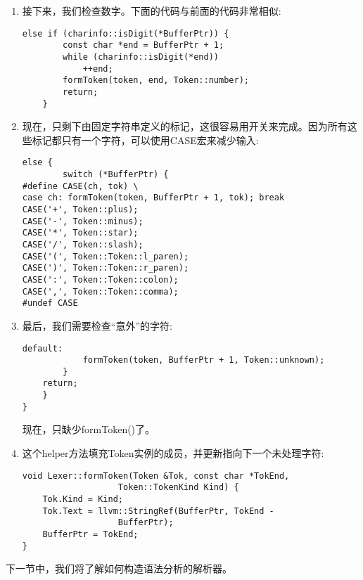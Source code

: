\begin{enumerate}
\item 接下来，我们检查数字。下面的代码与前面的代码非常相似:
\begin{lstlisting}[caption={}]
	else if (charinfo::isDigit(*BufferPtr)) {
		const char *end = BufferPtr + 1;
		while (charinfo::isDigit(*end))
			++end;
		formToken(token, end, Token::number);
		return;
	}
\end{lstlisting}

\item 现在，只剩下由固定字符串定义的标记，这很容易用开关来完成。因为所有这些标记都只有一个字符，可以使用CASE宏来减少输入:
\begin{lstlisting}[caption={}]
	else {
		switch (*BufferPtr) {
#define CASE(ch, tok) \
case ch: formToken(token, BufferPtr + 1, tok); break
CASE('+', Token::plus);
CASE('-', Token::minus);
CASE('*', Token::star);
CASE('/', Token::slash);
CASE('(', Token::Token::l_paren);
CASE(')', Token::Token::r_paren);
CASE(':', Token::Token::colon);
CASE(',', Token::Token::comma);
#undef CASE
\end{lstlisting}

\item 最后，我们需要检查“意外”的字符:
\begin{lstlisting}[caption={}]
		default:
			formToken(token, BufferPtr + 1, Token::unknown);
		}
	return;
	}
}
\end{lstlisting}
现在，只缺少formToken()了。

\item 这个helper方法填充Token实例的成员，并更新指向下一个未处理字符:
\begin{lstlisting}[caption={}]
void Lexer::formToken(Token &Tok, const char *TokEnd,
                   Token::TokenKind Kind) {
	Tok.Kind = Kind;
	Tok.Text = llvm::StringRef(BufferPtr, TokEnd -
				   BufferPtr);
	BufferPtr = TokEnd;
}
\end{lstlisting}
\end{enumerate}

下一节中，我们将了解如何构造语法分析的解析器。\par





































